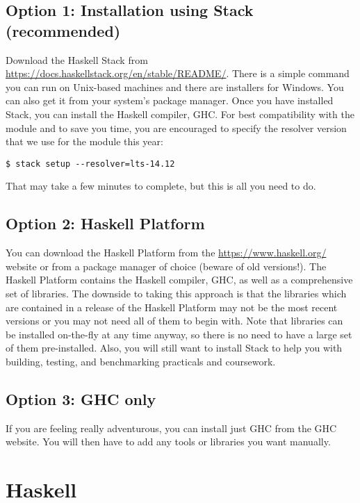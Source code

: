 \subsection{Option 1: Installation using Stack (recommended)}

Download the Haskell Stack from {\small \url{https://docs.haskellstack.org/en/stable/README/}}. There is a simple command you can run on Unix-based machines and there are installers for Windows. You can also get it from your system's package manager. Once you have installed Stack, you can install the Haskell compiler, GHC. For best compatibility with the module and to save you time, you are encouraged to specify the resolver version that we use for the module this year:
\begin{verbatim}
$ stack setup --resolver=lts-14.12
\end{verbatim}
That may take a few minutes to complete, but this is all you need to do.

\subsection{Option 2: Haskell Platform}

You can download the Haskell Platform from the {\small \url{https://www.haskell.org/}} website or from a package manager of choice (beware of old versions!). The Haskell Platform contains the Haskell compiler, GHC, as well as a comprehensive set of libraries. The downside to taking this approach is that the libraries which are contained in a release of the Haskell Platform may not be the most recent versions or you may not need all of them to begin with. Note that libraries can be installed on-the-fly at any time anyway, so there is no need to have a large set of them pre-installed. Also, you will still want to install Stack to help you with building, testing, and benchmarking practicals and coursework.

\subsection{Option 3: GHC only}

If you are feeling really adventurous, you can install just GHC from the GHC website. You will then have to add any tools or libraries you want manually.

\section{Haskell}

